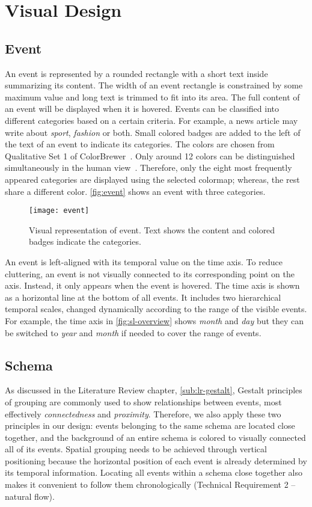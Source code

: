 \section{Visual Design}

\subsection{Event}
An event is represented by a rounded rectangle with a short text inside summarizing its content. The width of an event rectangle is constrained by some maximum value and long text is trimmed to fit into its area. The full content of an event will be displayed when it is hovered. Events can be classified into different categories based on a certain criteria. For example, a news article may write about \emph{sport}, \emph{fashion} or both. Small colored badges are added to the left of the text of an event to indicate its categories. The colors are chosen from Qualitative Set 1 of  ColorBrewer~\cite{Harrower2003}. Only around 12 colors can be distinguished simultaneously in the human view~\cite{Munzner2014}. Therefore, only the eight most frequently appeared categories are displayed using the selected colormap; whereas, the rest share a different color. \autoref{fig:event} shows an event with three categories.

\begin{figure}[!htb]
\centering
\texttt{[image: event]}
\caption{Visual representation of event. Text shows the content and colored badges indicate the categories.}
\label{fig:event}
\end{figure}

An event is left-aligned with its temporal value on the time axis. To reduce cluttering, an event is not visually connected to its corresponding point on the axis. Instead, it only appears when the event is hovered. The time axis is shown as a horizontal line at the bottom of all events. It includes two hierarchical temporal scales, changed dynamically according to the range of the visible events. For example, the time axis in \autoref{fig:sl-overview} shows \emph{month} and \emph{day} but they can be switched to \emph{year} and \emph{month} if needed to cover the range of events.

\subsection{Schema}
\label{sub:schema}
As discussed in the Literature Review chapter, \autoref{sub:lr-gestalt}, Gestalt principles of grouping are commonly used to show relationships between events, most effectively \emph{connectedness} and \emph{proximity}. Therefore, we also apply these two principles in our design: events belonging to the same schema are located close together, and the background of an entire schema is colored to visually connected all of its events. Spatial grouping needs to be achieved through vertical positioning because the horizontal position of each event is already determined by its temporal information. Locating all events within a schema close together also makes it convenient to follow them chronologically (Technical Requirement 2 -- natural flow).

